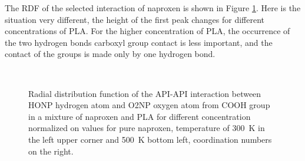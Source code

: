 The RDF of the selected interaction of naproxen is shown in Figure \ref{fig:nap_RDF_}. Here is the situation very different, the height of the first peak changes for different concentrations of PLA. For the higher concentration of PLA, the occurrence of the two hydrogen bonds carboxyl group contact is less important, and the contact of the groups is made only by one hydrogen bond.

\begin{figure}[htb!]
	\centering
	\\
	\caption{Radial distribution function of the API-API interaction between HONP hydrogen atom and O2NP oxygen atom from COOH group in a mixture of naproxen and PLA for different concentration normalized on values for pure naproxen, temperature of 300~K in the left upper corner and 500~K bottom left, coordination numbers on the right.}
	\label{fig:nap_RDF_}
\end{figure}

